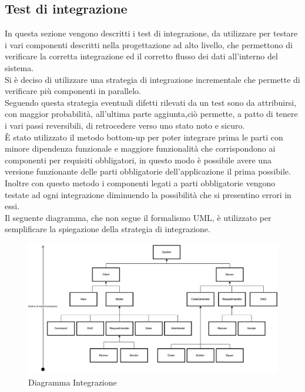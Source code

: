 \documentclass[../PianoDiQualifica.tex]{subfiles}
\begin{document}
	\subsection{Test di integrazione} 
	In questa sezione vengono descritti i test di integrazione, da utilizzare per testare i vari componenti descritti nella progettazione ad alto livello, che permettono di verificare la corretta integrazione ed il corretto flusso dei dati all'interno del sistema.\\	
	Si è deciso di utilizzare una strategia di integrazione incrementale che permette di verificare più componenti in parallelo.\\
	Seguendo questa strategia eventuali difetti rilevati da un test sono da attribuirsi, con maggior probabilità, all’ultima parte aggiunta,ciò permette, a patto di tenere i vari passi reversibili, di retrocedere verso uno stato noto e sicuro.\\
	È stato utilizzato il metodo bottom-up per poter integrare prima le parti con minore dipendenza funzionale e maggiore funzionalità che corrispondono ai componenti per requisiti obbligatori, in questo modo è possibile avere una versione funzionante delle parti obbligatorie dell’applicazione il prima possibile.\\
	Inoltre con questo metodo i componenti legati a parti obbligatorie vengono testate ad ogni integrazione diminuendo la possibilità che si presentino errori in essi.\\
	Il seguente diagramma, che non segue il formalismo UML, è utilizzato per semplificare la spiegazione della strategia di integrazione.
	
	\begin{figure}[htbp]
		\centering
		\includegraphics[scale=0.45]{Figures/Integrazione.pdf}
		\caption{Diagramma Integrazione}\label{}
	\end{figure}
	
\end{document}
